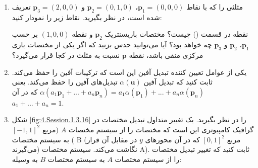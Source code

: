 {\begin{spacing}{1.5}
\begin{enumerate}[label=\textbf{\arabic*}.]
            \item {
                مثلثی را که با نقاط $\textbf{p}_{1}=(0,0,0)$، $\textbf{p}_{2}=(0,1,0)$ و $\textbf{p}_{3}=(2,0,0)$ تعریف شده است، در نظر بگیرید. نقاط زیر را نمودار کنید:
                 \textbf{\vspace{-6pt}}

                نقطه در قسمت () چیست؟ مختصات باریسنتریک $\textbf{p}_{2}$ و نقطه $(1,0,0)$ بر حسب $\textbf{p}_{1}$، $\textbf{p}_{2}$ و $\textbf{p}_{3}$ چه خواهد بود؟ آیا می‌توانید حدس بزنید که اگر یکی از مختصات باری مرکزی منفی باشد، نقطه $\textbf{p}$ نسبت به مثلث در کجا قرار می‌گیرد؟
            }

            \item {یکی از عوامل تعیین کننده تبدیل آفین این است که ترکیبات آفین را حفظ می‌کند.
            ثابت کنید که تبدیل آفین $\alpha(\textbf{u})$ تبدیل‌های آفین را حفظ می‌کند.
            یعنی $\alpha(a_{1}\textbf{p}_{1}+...+a_{n}\textbf{p}_{n})=a_{1}\alpha(\textbf{p}_{1})+...+a_{n}\alpha(\textbf{p}_{n})$ که در آن $a_{1}+...+a_{n}=1$.}

            \item {
                شکل \ref{fig:4.Session.1.3.16} را در نظر بگیرید.
                یک تغییر متداول تبدیل مختصات در گرافیک کامپیوتری این است که مختصات را از سیستم مختصات $A$ (مربع $[-1,1]^{2}$) به سیستم مختصات B (مربع $[0,1]^{2}$ که در آن محورهای $y$ در مقابل آن قرار می‌گیرند) نگاشت می‌کند. سیستم مختصات A).
                ثابت کنید که تغییر تبدیل مختصات را از سیستم مختصات $A$ به سیستم مختصات $B$ به وسیله:

}
\end{enumerate}
\end{spacing}}
